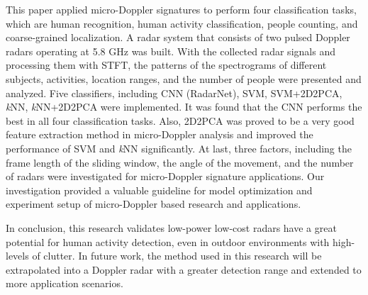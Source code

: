 This paper applied micro-Doppler signatures to perform four classification tasks, which are human recognition, human activity classification, people counting, and coarse-grained localization. A radar system that consists of two pulsed Doppler radars operating at 5.8 GHz was built. With the collected radar signals and processing them with STFT, the patterns of the spectrograms of different subjects, activities, location ranges, and the number of people were presented and analyzed. Five classifiers, including CNN (RadarNet), SVM, SVM+2D2PCA, \textit{k}NN, \textit{k}NN+2D2PCA were implemented. It was found that the CNN performs the best in all four classification tasks. Also, 2D2PCA was proved to be a very good feature extraction method in micro-Doppler analysis and improved the performance of SVM and \textit{k}NN significantly. At last, three factors, including the frame length of the sliding window, the angle of the movement, and the number of radars were investigated for micro-Doppler signature applications. Our investigation provided a valuable guideline for model optimization and experiment setup of micro-Doppler based research and applications.

In conclusion, this research validates low-power low-cost radars have a great potential for human activity detection, even in outdoor environments with high-levels of clutter. In future work, the method used in this research will be extrapolated into a Doppler radar with a greater detection range and extended to more application scenarios.